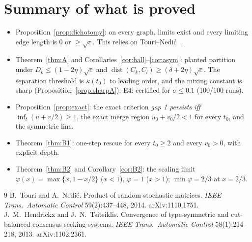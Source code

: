 \documentclass[11pt]{article}
\theoremstyle{definition}
\theoremstyle{remark}
\newcommand{\dist}{\operatorname{dist}}
\begin{document}
\section{Summary of what is proved}
\begin{itemize}
\item Proposition~\ref{prop:dichotomy}: on every graph, limits exist and every limiting edge length is $0$ or $\ge\sqrt c$.
This relies on Touri--Nedi\'c~\cite{TN14}.
\item Theorem~\ref{thm:A} and Corollaries~\ref{cor:ball}--\ref{cor:asym}: planted partition under $D_k\le(1-2\eta)\sqrt c$
and $\dist(C_k,C_l)\ge(\delta+2\eta)\sqrt c$. The separation threshold is $\kappa(t_0)$ to leading order, and the mixing
constant is sharp (Proposition~\ref{prop:sharpA}). E4: certified for $\sigma\le0.1$ (100/100 runs).
\item Proposition~\ref{prop:exact}: the exact criterion \emph{gap 1 persists iff $\inf_t(u+v/2)\ge1$}, the exact merge region
$u_0+v_0/2<1$ for every $t_0$, and the symmetric line.
\item Theorem~\ref{thm:B1}: one-step rescue for every $t_0\ge2$ and every $v_0>0$, with explicit depth.
\item Theorem~\ref{thm:B2} and Corollary~\ref{cor:B2}: the scaling limit $\varphi(x)=\max\{x,1-x/2\}$ ($x<1$),
$\varphi=1$ ($x>1$); $\min\varphi=2/3$ at $x=2/3$.
\end{itemize}

\begin{thebibliography}{9}
 B.~Touri and A.~Nedi\'c. Product of random stochastic matrices.
\emph{IEEE Trans.\ Automatic Control} 59(2):437--448, 2014. arXiv:1110.1751.
 J.~M.~Hendrickx and J.~N.~Tsitsiklis. Convergence of type-symmetric and cut-balanced
consensus seeking systems. \emph{IEEE Trans.\ Automatic Control} 58(1):214--218, 2013. arXiv:1102.2361.
\end{thebibliography}
\end{document}
